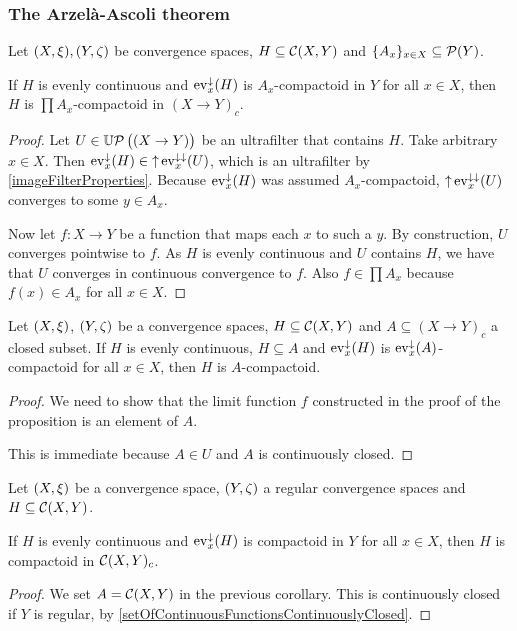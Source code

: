 \subsubsection{The Arzelà-Ascoli theorem}
\begin{proposition}
Let $\sSet{X,\xi},\sSet{Y, \zeta}$ be convergence spaces, $H\subseteq \operatorname{\mathcal{C}}(X, Y)$ and $\{A_x\}_{x\in X}\subseteq \operatorname{\mathcal{P}}(Y)$.

If $H$ is evenly continuous and $\operatorname{ev}_x^\downarrow(H)$ is $A_x$-compactoid in $Y$ for all $x\in X$, then $H$ is $\prod A_x$-compactoid in $(X\to Y)_c$.
\end{proposition}
\begin{proof}
Let $U\in\operatorname{\mathbb{U}\mathcal{P}}\big((X\to Y)\big)$ be an ultrafilter that contains $H$. Take arbitrary $x\in X$. Then $\operatorname{ev}_x^\downarrow(H) \in \operatorname{\uparrow}\operatorname{ev}_x^{\downarrow\downarrow}(U)$, which is an ultrafilter by \ref{imageFilterProperties}. Because $\operatorname{ev}_x^\downarrow(H)$ was assumed $A_x$-compactoid, $\operatorname{\uparrow}\operatorname{ev}_x^{\downarrow\downarrow}(U)$ converges to some $y\in A_x$.

Now let $f: X\to Y$ be a function that maps each $x$ to such a $y$. By construction, $U$ converges pointwise to $f$. As $H$ is evenly continuous and $U$ contains $H$, we have that $U$ converges in continuous convergence to $f$. Also $f\in \prod A_x$ because $f(x) \in A_x$ for all $x\in X$.
\end{proof}
\begin{corollary}
Let $\sSet{X,\xi}$, $\sSet{Y, \zeta}$ be a convergence spaces, $H\subseteq \operatorname{\mathcal{C}}(X, Y)$ and $A\subseteq(X\to Y)_c$ a closed subset.
If $H$ is evenly continuous, $H\subseteq A$ and $\operatorname{ev}_x^\downarrow(H)$ is $\operatorname{ev}_x^\downarrow(A)$-compactoid for all $x\in X$, then  $H$ is $A$-compactoid.
\end{corollary}
\begin{proof}
We need to show that the limit function $f$ constructed in the proof of the proposition is an element of $A$.

This is immediate because $A\in U$ and $A$ is continuously closed.
\end{proof}
\begin{corollary}
Let $\sSet{X,\xi}$ be a convergence space, $\sSet{Y, \zeta}$ a regular convergence spaces and $H\subseteq \operatorname{\mathcal{C}}(X, Y)$.

If $H$ is evenly continuous and $\operatorname{ev}_x^\downarrow(H)$ is compactoid in $Y$ for all $x\in X$, then $H$ is compactoid in $\operatorname{\mathcal{C}}(X, Y)_c$.
\end{corollary}
\begin{proof}
We set $A = \operatorname{\mathcal{C}}(X,Y)$ in the previous corollary. This is continuously closed if $Y$ is regular, by \ref{setOfContinuousFunctionsContinuouslyClosed}.
\end{proof}
